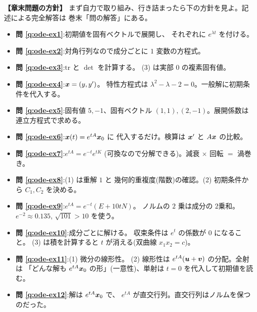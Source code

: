\bigskip
{\small
\noindent\textbf{【章末問題の方針】}\quad
まず自力で取り組み、行き詰まったら下の方針を見よ。記述による完全解答は
巻末「問の解答」にある。
\begin{itemize}
\item \textbf{問 \ref{q:ode-ex1}}:初期値を固有ベクトルで展開し、
それぞれに $e^{\lambda t}$ を付ける。
\item \textbf{問 \ref{q:ode-ex2}}:対角行列なので成分ごとに
$1$ 変数の方程式。
\item \textbf{問 \ref{q:ode-ex3}}:$\mathrm{tr}$ と $\det$ を計算する。
(3) は実部 $0$ の複素固有値。
\item \textbf{問 \ref{q:ode-ex4}}:$\bm{x} = (y, y')$。
特性方程式は $\lambda^2 - \lambda - 2 = 0$。一般解に初期条件を代入する。
\item \textbf{問 \ref{q:ode-ex5}}:固有値 $5, -1$、固有ベクトル
$(1, 1), (2, -1)$。展開係数は連立方程式で求める。
\item \textbf{問 \ref{q:ode-ex6}}:$\bm{x}(t) = e^{tA}\bm{x}_0$ に
代入するだけ。検算は $\bm{x}'$ と $A\bm{x}$ の比較。
\item \textbf{問 \ref{q:ode-ex7}}:$e^{tA} = e^{-t}e^{tK}$
(可換なので分解できる)。減衰 $\times$ 回転 $=$ 渦巻き。
\item \textbf{問 \ref{q:ode-ex8}}:(1) は重解 $1$ と
幾何的重複度(階数)の確認。(2) 初期条件から $C_1, C_2$ を決める。
\item \textbf{問 \ref{q:ode-ex9}}:$e^{tA} = e^{-t}(E + 10tN)$。
ノルムの $2$ 乗は成分の $2$乗和。$e^{-2} \approx 0.135$,
$\sqrt{101} > 10$ を使う。
\item \textbf{問 \ref{q:ode-ex10}}:成分ごとに解ける。
収束条件は $e^{t}$ の係数が $0$ になること。
(3) は積を計算すると $t$ が消える(双曲線 $x_1 x_2 = c$)。
\item \textbf{問 \ref{q:ode-ex11}}:(1) 微分の線形性。
(2) 線形性は $e^{tA}(\bm{u} + \bm{v})$ の分配。全射は
「どんな解も $e^{tA}\bm{x}_0$ の形」(一意性)、単射は
$t = 0$ を代入して初期値を読む。
\item \textbf{問 \ref{q:ode-ex12}}:解は $e^{tA}\bm{x}_0$ で、
$e^{tA}$ が直交行列。直交行列はノルムを保つのだった。
\end{itemize}
}

